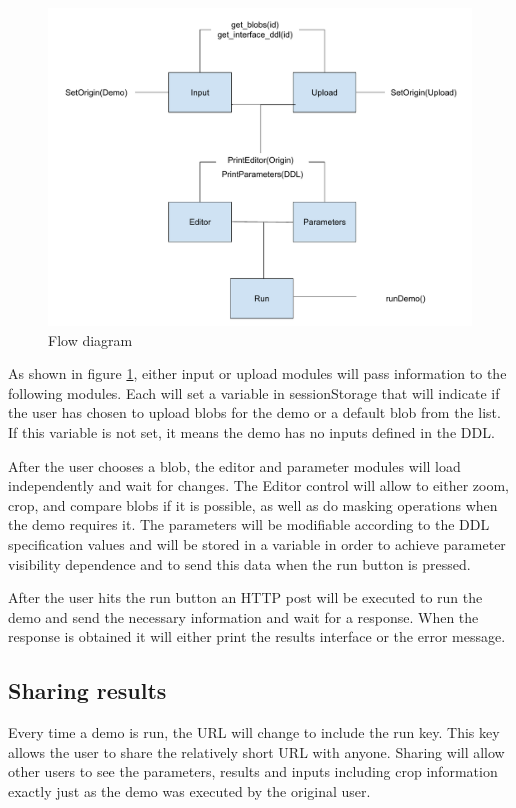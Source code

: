 \begin{figure}[h]
	\centering
	\includegraphics[width=\textwidth]{images/flow}
	\caption{Flow diagram} 
	\label{fig:flow_diagram}
\end{figure} 


As shown in figure  \ref{fig:flow_diagram}, either input or upload modules will pass 
information to the following modules. Each will set a variable in sessionStorage that will indicate if the user has chosen to 
upload blobs for the demo or a default blob from the list. If this variable is not set, it means the demo has no inputs defined 
in the DDL.

After the user chooses a blob, the editor and parameter modules will load independently and wait for changes. The Editor control 
will allow to either zoom, crop, and compare blobs if it is possible, as well as do masking operations when the demo requires it. 
The parameters will be modifiable according to the DDL specification values and will be stored in a variable in order to achieve 
parameter visibility dependence and to send this data when the run button is pressed.

After the user hits the run button an HTTP post will be executed to run the demo and send the necessary information and wait for 
a response. When the response is obtained it will either print the results interface or the error message.


\subsection{Sharing results}
Every time a demo is run, the URL will change to include the run key. This key allows the user to share the relatively short URL 
with anyone. Sharing will allow other users to see the parameters, results and inputs including crop information exactly just as the 
demo was executed by the original user. 

